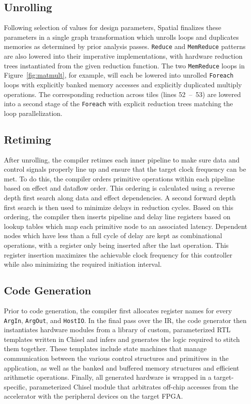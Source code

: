 


\subsection{Unrolling}
Following selection of values for design parameters, Spatial finalizes these parameters in a single graph transformation which unrolls loops and duplicates memories as determined by prior analysis passes.
\texttt{Reduce} and \texttt{MemReduce} patterns are also lowered into their imperative implementations, with hardware reduction trees instantiated from the given reduction function.
The two \texttt{MemReduce} loops in Figure~\ref{fig:matmult}, for example, will each be lowered into unrolled \texttt{Foreach} loops with explicitly banked memory accesses and explicitly duplicated multiply operations. The corresponding reduction across tiles (lines 52~--~53) are lowered into a second stage of the \texttt{Foreach} with explicit reduction trees matching the loop parallelization.

\subsection{Retiming}
After unrolling, the compiler retimes each inner pipeline to make sure data and control signals properly line up and ensure that the target clock frequency can be met.
To do this, the compiler orders primitive operations within each pipeline based on effect and dataflow order.
This ordering is calculated using a reverse depth first search along data and effect dependencies.
A second forward depth first search is then used to minimize delays in reduction cycles.
Based on this ordering, the compiler then inserts pipeline and delay line registers based on lookup tables which map each primitive node to an associated latency. Dependent nodes which have less than a full cycle of delay are kept as combinational operations, with a register only being inserted after the last operation.
This register insertion maximizes the achievable clock frequency for this controller while also minimizing the required initiation interval.



\subsection{Code Generation}
Prior to code generation, the compiler first allocates register names for every \texttt{\small{ArgIn}}, \texttt{\small{ArgOut}}, and \texttt{\small{HostIO}}.
In the final pass over the IR, the code generator then instantiates hardware modules from a library of custom, parameterized RTL templates written in Chisel and infers and generates the logic required to stitch them together.  These templates include state machines that manage communication between the various control structures and primitives in the application, as well as the banked and buffered memory structures and efficient arithmetic operations.  Finally, all generated hardware is wrapped in a target-specific, parameterized Chisel module that arbitrates off-chip accesses from the accelerator with the peripheral devices on the target FPGA.
